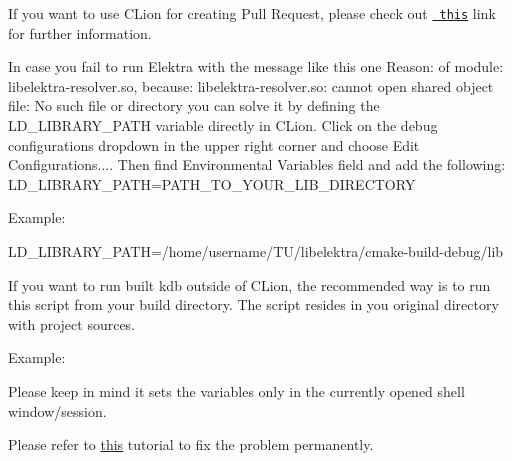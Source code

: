 If you want to use C\+Lion for creating Pull Request, please check out \href{https://www.jetbrains.com/help/clion/contribute-to-projects.html\#create-pull-request}{\texttt{ this}} link for further information.

In case you fail to run Elektra with the message like this one {\ttfamily Reason\+: of module\+: libelektra-\/resolver.\+so, because\+: libelektra-\/resolver.\+so\+: cannot open shared object file\+: No such file or directory} you can solve it by defining the L\+D\+\_\+\+L\+I\+B\+R\+A\+R\+Y\+\_\+\+P\+A\+TH variable directly in C\+Lion. Click on the debug configurations dropdown in the upper right corner and choose \textquotesingle{}Edit Configurations...\textquotesingle{}. Then find \textquotesingle{}Environmental Variables\textquotesingle{} field and add the following\+: L\+D\+\_\+\+L\+I\+B\+R\+A\+R\+Y\+\_\+\+P\+A\+TH=P\+A\+T\+H\+\_\+\+T\+O\+\_\+\+Y\+O\+U\+R\+\_\+\+L\+I\+B\+\_\+\+D\+I\+R\+E\+C\+T\+O\+RY

Example\+:

L\+D\+\_\+\+L\+I\+B\+R\+A\+R\+Y\+\_\+\+P\+A\+TH=/home/username/\+T\+U/libelektra/cmake-\/build-\/debug/lib

If you want to run built {\ttfamily kdb} outside of C\+Lion, the recommended way is to run this script from your build directory. The script resides in you original directory with project sources.

Example\+:


\begin{DoxyCode}{0}
\end{DoxyCode}


Please keep in mind it sets the variables only in the currently opened shell window/session.

Please refer to \mbox{\hyperlink{doc_COMPILE_md}{this}} tutorial to fix the problem permanently.


